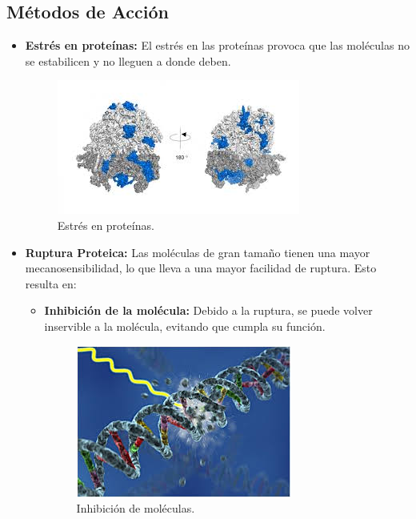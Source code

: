 \documentclass[twocolumn]{article}
\begin{document}
\subsection{Métodos de Acción}
\begin{itemize}
    \item \textbf{Estrés en proteínas:} El estrés en las proteínas provoca que las moléculas no se estabilicen y no lleguen a donde deben.
    \begin{figure}[!h]
        \centering
        \includegraphics[width=\linewidth]{imagenes/descarga.jpeg}
        \caption{Estrés en proteínas.}
    \end{figure}
    
    \item \textbf{Ruptura Proteica:} Las moléculas de gran tamaño tienen una mayor mecanosensibilidad, lo que lleva a una mayor facilidad de ruptura. Esto resulta en:
    \begin{itemize}
        \item \textbf{Inhibición de la molécula:} Debido a la ruptura, se puede volver inservible a la molécula, evitando que cumpla su función.
        \begin{figure}[!h]
            \centering
            \includegraphics[width=\linewidth]{imagenes/descarga (1).jpeg}
            \caption{Inhibición de moléculas.}
        \end{figure}
        

\end{itemize}
\end{itemize}
\end{document}
